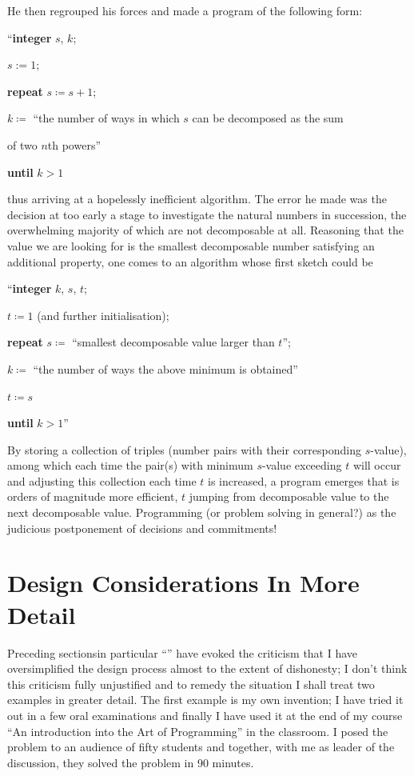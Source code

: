 \documentclass[twoside,11pt]{book}
\begin{document}
He then regrouped his forces and made a program of the following form:

\quad \hspace{-.4em}``\textbf{integer} $s$, $k$;

\quad $s:= 1$;

\quad \textbf{repeat} $s\coloneq s + 1$;

\quad \quad $k\coloneq$ ``the number of ways in which $s$ can be decomposed as the sum

\quad \quad\quad of two $n$th powers''

\quad \textbf{until} $k > 1$

\noindent
thus arriving at a hopelessly inefficient algorithm. The error he made was the decision at too early a stage to investigate the natural numbers in succession, the overwhelming majority of which are not decomposable at all. Reasoning that the value we are looking for is the smallest decomposable number satisfying an additional property, one comes to an algorithm whose first sketch could be

\quad \hspace{-.4em}``\textbf{integer} $k$, $s$, $t$;

\quad $t \coloneq 1$ (and further initialisation);

\quad \textbf{repeat} $s \coloneq$ ``smallest decomposable value larger than $t$'';

\quad \quad $k \coloneq$ ``the number of ways the above minimum is obtained''

\quad \quad $t \coloneq s$

\quad \textbf{until} $k > 1$''

By storing a collection of triples (number pairs with their corresponding $s$-value), among which each time the pair(s) with minimum $s$-value exceeding $t$ will occur and adjusting this collection each time $t$ is increased, a program emerges that is orders of magnitude more efficient, $t$ jumping from decomposable value to the next decomposable value. Programming (or problem solving in general?) as the judicious postponement of decisions and commitments!

\section[Design considerations in more detail]{Design Considerations In More Detail}

Preceding sections\textemdash{}in particular ``'' have evoked the criticism that I have oversimplified the design process almost to the extent of dishonesty; I don't think this criticism fully unjustified and to remedy the situation I shall treat two examples in greater detail. The first example is my own invention; I have tried it out in a few oral examinations and finally I have used it at the end of my course ``An introduction into the Art of Programming'' in the classroom. I posed the problem to an audience of fifty students and together, with me as leader of the discussion, they solved the problem in 90 minutes.
\end{document}
